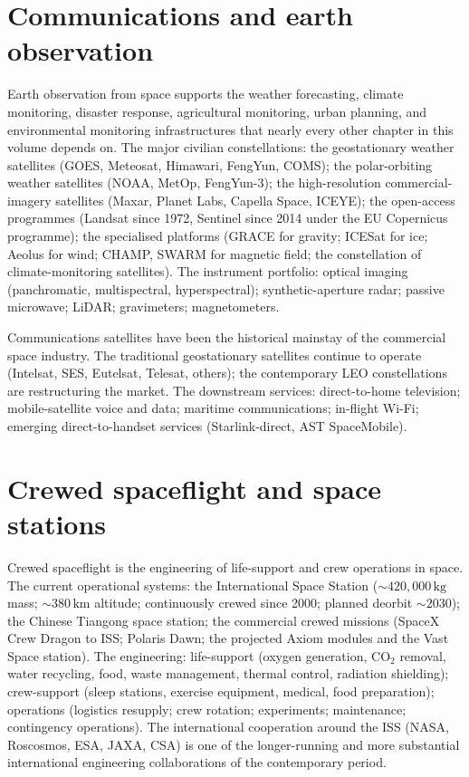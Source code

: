 \section{Communications and earth observation}

Earth observation from space supports the weather forecasting, climate monitoring, disaster response, agricultural monitoring, urban planning, and environmental monitoring infrastructures that nearly every other chapter in this volume depends on. The major civilian constellations: the geostationary weather satellites (GOES, Meteosat, Himawari, FengYun, COMS); the polar-orbiting weather satellites (NOAA, MetOp, FengYun-3); the high-resolution commercial-imagery satellites (Maxar, Planet Labs, Capella Space, ICEYE); the open-access programmes (Landsat since 1972, Sentinel since 2014 under the EU Copernicus programme); the specialised platforms (GRACE for gravity; ICESat for ice; Aeolus for wind; CHAMP, SWARM for magnetic field; the constellation of climate-monitoring satellites). The instrument portfolio: optical imaging (panchromatic, multispectral, hyperspectral); synthetic-aperture radar; passive microwave; LiDAR; gravimeters; magnetometers.

Communications satellites have been the historical mainstay of the commercial space industry. The traditional geostationary satellites continue to operate (Intelsat, SES, Eutelsat, Telesat, others); the contemporary LEO constellations are restructuring the market. The downstream services: direct-to-home television; mobile-satellite voice and data; maritime communications; in-flight Wi-Fi; emerging direct-to-handset services (Starlink-direct, AST SpaceMobile).

\section{Crewed spaceflight and space stations}

Crewed spaceflight is the engineering of life-support and crew operations in space. The current operational systems: the International Space Station ($\sim 420{,}000\,\text{kg}$ mass; $\sim 380\,\text{km}$ altitude; continuously crewed since 2000; planned deorbit $\sim 2030$); the Chinese Tiangong space station; the commercial crewed missions (SpaceX Crew Dragon to ISS; Polaris Dawn; the projected Axiom modules and the Vast Space station). The engineering: life-support (oxygen generation, CO$_2$ removal, water recycling, food, waste management, thermal control, radiation shielding); crew-support (sleep stations, exercise equipment, medical, food preparation); operations (logistics resupply; crew rotation; experiments; maintenance; contingency operations). The international cooperation around the ISS (NASA, Roscosmos, ESA, JAXA, CSA) is one of the longer-running and more substantial international engineering collaborations of the contemporary period.

